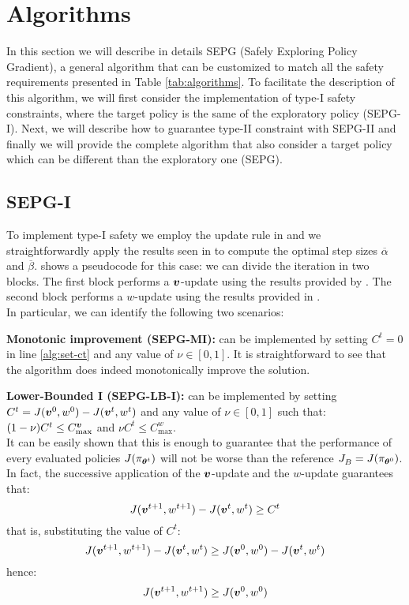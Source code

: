 \section{Algorithms}\label{sec:algos}

In this section we will describe in details SEPG (Safely Exploring Policy Gradient), a general algorithm that can be customized to match all the safety requirements presented in Table \ref{tab:algorithms}. To facilitate the description of this algorithm, we will first consider the implementation of type-I safety constraints, where the target policy is the same of the exploratory policy (SEPG-I). Next, we will describe how to guarantee type-II constraint with SEPG-II and finally we will provide the complete algorithm that also consider a target policy which can be different than the exploratory one (SEPG).

\subsection{SEPG-I}

To implement type-I safety we employ the update rule in  and we straightforwardly apply the results seen in  to compute the optimal step sizes $\overline{\alpha}$ and $\overline{\beta}$.  shows a pseudocode for this case: we can divide the iteration in two blocks. The first block performs a $\vv$-update using the results provided by . The second block performs a $w$-update using the results provided in . \\
In particular, we can identify the following two scenarios:

\textbf{Monotonic improvement (SEPG-MI):} can be implemented by setting $C^t=0$ in line \ref{alg:set-ct} and any value of $\nu\in[0,1]$. It is straightforward to see that the algorithm does indeed monotonically improve the solution.

\textbf{Lower-Bounded I (SEPG-LB-I):} can be implemented by setting $C^t = J(\vv^0, w^0) - J(\vv^t, w^t)$ and any value of $\nu\in[0,1]$ such that: $(1-\nu)C^t \leq C_{\text{max}}^{\vv}$ and $\nu C^t \leq C_{\text{max}}^w$. \\
It can be easily shown that this is enough to guarantee that the performance of every evaluated policies $J(\pi_{\vtheta^t})$ will not be worse than the reference $\jbase[] = J(\pi_{\vtheta^0})$.  In fact, the successive application of the $\vv$-update and the $w$-update guarantees that:
\[
J(\vv^{t+1}, w^{t+1}) - J(\vv^t, w^t) \geq C^t
\]
that is, substituting the value of $C^t$:
\[
J(\vv^{t+1}, w^{t+1}) - J(\vv^t, w^t) \geq J(\vv^0, w^0) - J(\vv^t, w^t)
\]
hence:
\[
J(\vv^{t+1}, w^{t+1})  \geq J(\vv^0, w^0)
\]

